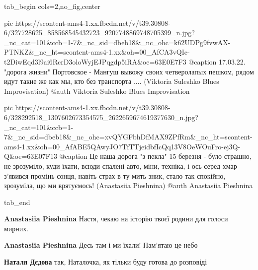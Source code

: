 \begin{minipage}{\textwidth}

\ifcmt
  tab_begin cols=2,no_fig,center

     pic https://scontent-ams4-1.xx.fbcdn.net/v/t39.30808-6/327728625_858568545432723_9207748869748705399_n.jpg?_nc_cat=101&ccb=1-7&_nc_sid=dbeb18&_nc_ohc=k62UDPg9fvwAX-PTNKZ&_nc_ht=scontent-ams4-1.xx&oh=00_AfCA3vQIc-t2DiwEqd3l9ai6RcrD3oloWyjEJPqgdp5iRA&oe=63E0E7F3
     @caption 17.03.22. "дорога жизни" Портовское - Мангуш вывожу своих четверолапых пешком, рядом идут такие же как мы, кто без транспорта .... (Viktoria Suleshko Blues Improvisation)
     @auth Viktoria Suleshko Blues Improvisation

     pic https://scontent-ams4-1.xx.fbcdn.net/v/t39.30808-6/328292518_1307602673354575_2622659674619377630_n.jpg?_nc_cat=101&ccb=1-7&_nc_sid=dbeb18&_nc_ohc=xvQYGFbhDfMAX9ZPfRm&_nc_ht=scontent-ams4-1.xx&oh=00_AfABE5QAwyJO7TfTTjeidbfIcQq13V8OeWOuFro-ej3Q-Q&oe=63E07F13
     @caption Це наша дорога "з пекла" 15 березня - було страшно, не зрозуміло, куди їхати, всюди спалені авто, міни, техніка, і ось серед хмар з'явився промінь сонця, навіть страх в ту мить зник, стало так спокійно, зрозуміла, що ми врятуємось! (Anastasiia Pieshnina)
     @auth Anastasiia Pieshnina


  tab_end
\fi
\end{minipage}

\begin{itemize} %
\textbf{Anastasiia Pieshnina} Настя, чекаю на історію твоєї родини для голоси мирних.

\textbf{Anastasiia Pieshnina} Десь там і ми їхали! Пам'ятаю це небо🙌

\textbf{Наталя Дєдова} так, Наталочка, як тільки буду готова до розповіді
\end{itemize} %

